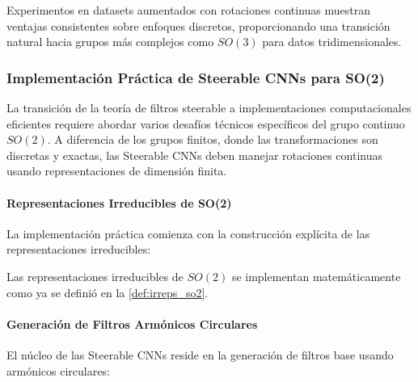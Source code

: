 Experimentos en datasets aumentados con rotaciones continuas muestran ventajas consistentes sobre enfoques discretos, proporcionando una transición natural hacia grupos más complejos como $SO(3)$ para datos tridimensionales.

\subsubsection{Implementación Práctica de Steerable CNNs para SO(2)}\label{subsubsec:implementacion_steerable_cnns}

La transición de la teoría de filtros steerable a implementaciones computacionales eficientes requiere abordar varios desafíos técnicos específicos del grupo continuo $SO(2)$. A diferencia de los grupos finitos, donde las transformaciones son discretas y exactas, las Steerable CNNs deben manejar rotaciones continuas usando representaciones de dimensión finita.

\paragraph{Representaciones Irreducibles de SO(2)}

La implementación práctica comienza con la construcción explícita de las representaciones irreducibles:

Las representaciones irreducibles de $SO(2)$ se implementan matemáticamente como ya se definió en la \autoref{def:irreps_so2}.

\paragraph{Generación de Filtros Armónicos Circulares}

El núcleo de las Steerable CNNs reside en la generación de filtros base usando armónicos circulares:

